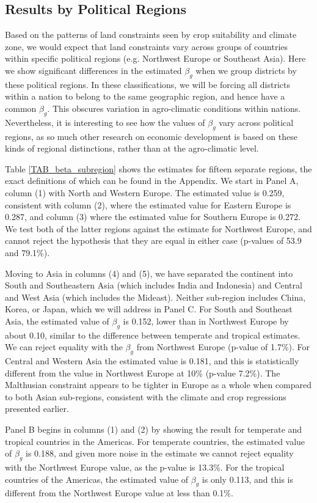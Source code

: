 \documentclass[11pt]{article}
\begin{document}
\subsection{Results by Political Regions}
Based on the patterns of land constraints seen by crop suitability and climate zone, we would expect that land constraints vary across groups of countries within specific political regions (e.g. Northwest Europe or Southeast Asia). Here we show significant differences in the estimated $\beta_g$ when we group districts by these political regions. In these classifications, we will be forcing all districts within a nation to belong to the same geographic region, and hence have a common $\beta_g$. This obscures variation in agro-climatic conditions within nations. Nevertheless, it is interesting to see how the values of $\beta_g$ vary across political regions, as so much other research on economic development is based on these kinds of regional distinctions, rather than at the agro-climatic level.

Table \ref{TAB_beta_subregion} shows the estimates for fifteen separate regions, the exact definitions of which can be found in the Appendix. We start in Panel A, column (1) with North and Western Europe. The estimated value is 0.259, consistent with column (2), where the estimated value for Eastern Europe is 0.287, and column (3) where the estimated value for Southern Europe is 0.272. We test both of the latter regions against the estimate for Northwest Europe, and cannot reject the hypothesis that they are equal in either case (p-values of 53.9 and 79.1\%). 

Moving to Asia in columns (4) and (5), we have separated the continent into South and Southeastern Asia (which includes India and Indonesia) and Central and West Asia (which includes the Mideast). Neither sub-region includes China, Korea, or Japan, which we will address in Panel C. For South and Southeast Asia, the estimated value of $\beta_g$ is 0.152, lower than in Northwest Europe by about 0.10, similar to the difference between temperate and tropical estimates. We can reject equality with the $\beta_g$ from Northwest Europe (p-value of 1.7\%). For Central and Western Asia the estimated value is 0.181, and this is statistically different from the value in Northwest Europe at 10\% (p-value 7.2\%). The Malthusian constraint appears to be tighter in Europe as a whole when compared to both Asian sub-regions, consistent with the climate and crop regressions presented earlier.

Panel B begins in columns (1) and (2) by showing the result for temperate and tropical countries in the Americas. For temperate countries, the estimated value of $\beta_g$ is 0.188, and given more noise in the estimate we cannot reject equality with the Northwest Europe value, as the p-value is 13.3\%. For the tropical countries of the Americas, the estimated value of $\beta_g$ is only 0.113, and this is different from the Northwest Europe value at less than 0.1\%.
\end{document}
